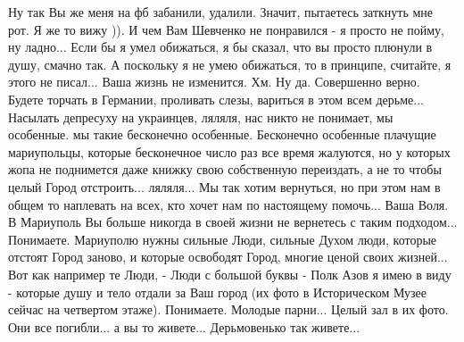  
 
 
 
 

Ну так Вы же меня на фб забанили, удалили. Значит, пытаетесь заткнуть мне рот.
Я же то вижу )). И чем Вам Шевченко не понравился - я просто не пойму, ну
ладно... Если бы я умел обижаться, я бы сказал, что вы просто плюнули в душу,
смачно так. А поскольку я не умею обижаться, то в принципе, считайте, я этого
не писал... Ваша жизнь не изменится. Хм. Ну да. Совершенно верно. Будете
торчать в Германии, проливать слезы, вариться в этом всем дерьме... Насылать
депресуху на украинцев, ляляля, нас никто не понимает, мы особенные. мы такие
бесконечно особенные. Бесконечно особенные плачущие мариупольцы, которые бесконечное число раз 
все время жалуются, но у которых жопа не поднимется даже книжку свою собственную переиздать, а не то чтобы целый 
Город отстроить... ляляля... 
Мы так хотим вернуться, но при этом нам в общем то наплевать на всех, кто хочет нам по
настоящему помочь... Ваша Воля. В Мариуполь Вы больше никогда в своей жизни не
вернетесь с таким подходом... Понимаете. Мариуполю нужны сильные Люди, сильные
Духом люди, которые отстоят Город заново, и которые освободят Город, многие
ценой своих жизней... Вот как например те Люди, - Люди с большой буквы - Полк Азов я имею в виду -
которые душу и тело отдали за Ваш город (их фото в Историческом Музее сейчас на
четвертом этаже). Понимаете. Молодые парни... Целый зал в их фото. Они 
все погибли... а вы то живете... Дерьмовенько так живете...
